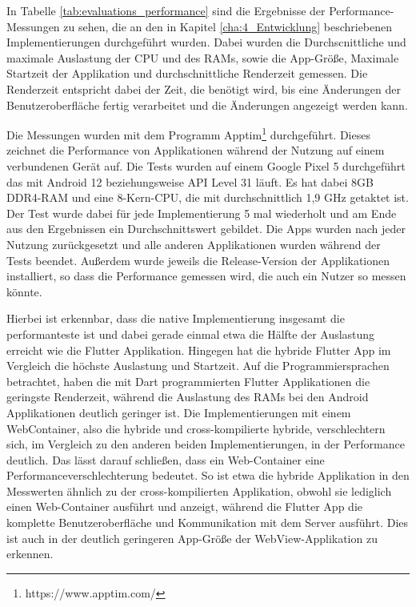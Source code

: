 In Tabelle \ref{tab:evaluations_performance} sind die Ergebnisse der Performance-Messungen zu sehen, die an den in Kapitel \ref{cha:4_Entwicklung} beschriebenen Implementierungen durchgeführt wurden. Dabei wurden die Durchscnittliche und maximale Auslastung der CPU und des RAMs, sowie die App-Größe, Maximale Startzeit der Applikation und durchschnittliche Renderzeit gemessen. 
Die Renderzeit entspricht dabei der Zeit, die benötigt wird, bis eine Änderungen der Benutzeroberfläche fertig verarbeitet und die Änderungen angezeigt werden kann.

Die Messungen wurden mit dem Programm Apptim\footnote{https://www.apptim.com/} durchgeführt. Dieses zeichnet die Performance von Applikationen während der Nutzung auf einem verbundenen Gerät auf. Die Tests wurden auf einem Google Pixel 5 durchgeführt das mit Android 12 beziehungsweise API Level 31 läuft. Es hat dabei 8GB DDR4-RAM und eine 8-Kern-CPU, die mit durchschnittlich 1,9 GHz getaktet ist.
Der Test wurde dabei für jede Implementierung 5 mal wiederholt und am Ende aus den Ergebnissen ein Durchschnittswert gebildet.
Die Apps wurden nach jeder Nutzung zurückgesetzt und alle anderen Applikationen wurden während der Tests beendet.
Außerdem wurde jeweils die Release-Version der Applikationen installiert, so dass die Performance gemessen wird, die auch ein Nutzer so messen könnte.

Hierbei ist erkennbar, dass die native Implementierung insgesamt die performanteste ist und dabei gerade einmal etwa die Hälfte der Auslastung erreicht wie die Flutter Applikation.
Hingegen hat die hybride Flutter App im Vergleich die höchste Auslastung und Startzeit.
Auf die Programmiersprachen betrachtet, haben die mit Dart programmierten Flutter Applikationen die geringste Renderzeit, während die Auslastung des RAMs bei den Android Applikationen deutlich geringer ist.
Die Implementierungen mit einem WebContainer, also die hybride und cross-kompilierte hybride, verschlechtern sich, im Vergleich zu den anderen beiden Implementierungen, in der Performance deutlich. Das lässt darauf schließen, dass ein Web-Container eine  Performanceverschlechterung bedeutet. So ist etwa die hybride Applikation in den Messwerten ähnlich zu der cross-kompilierten Applikation, obwohl sie lediglich einen Web-Container ausführt und anzeigt, während die Flutter App die komplette Benutzeroberfläche und Kommunikation mit dem Server ausführt. Dies ist auch in der deutlich geringeren App-Größe der WebView-Applikation zu erkennen.  

